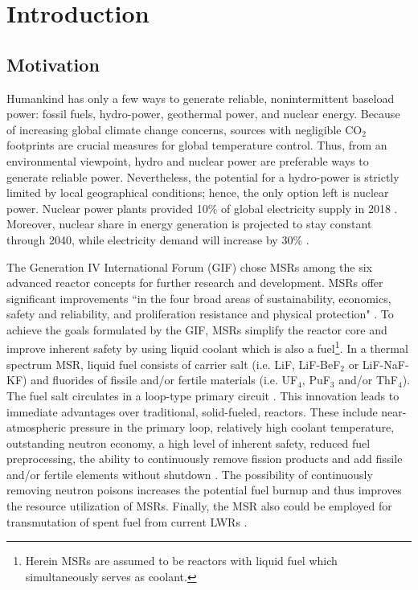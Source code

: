 \chapter[Introduction]{Introduction}
\section{Motivation}
Humankind has only a few ways to generate reliable, nonintermittent baseload 
power: fossil fuels, hydro-power, geothermal power, and nuclear energy. 
Because of increasing global climate change concerns, sources with negligible 
CO$_2$ footprints are crucial measures for global temperature control. Thus, 
from an environmental viewpoint, hydro and nuclear power are preferable ways 
to generate reliable power. Nevertheless, the potential for a hydro-power is 
strictly limited by local geographical conditions; hence, the only option left 
is nuclear power. Nuclear power plants provided 10\% of global electricity 
supply in 2018 \cite{iea_nuclear_2019}. Moreover, nuclear share in energy 
generation is projected to stay constant through 2040, while electricity 
demand will increase by 30\% \cite{noauthor_world_2017}. 

The Generation IV International Forum (GIF) chose \glspl{MSR} among the six 
advanced reactor concepts for further research and development. \glspl{MSR} 
offer significant improvements ``in the four broad areas of sustainability, 
economics, safety and reliability, and proliferation resistance and physical 
protection" \cite{doe_technology_2002}. To achieve the goals formulated by the 
GIF, \glspl{MSR} simplify the reactor core and improve inherent safety by 
using liquid coolant which is also a fuel\footnote{Herein \glspl{MSR} are 
assumed to be reactors with liquid fuel which simultaneously serves as 
coolant.}. In a thermal spectrum \gls{MSR}, liquid fuel consists of carrier 
salt (i.e. LiF, LiF-BeF$_2$ or LiF-NaF-KF) and fluorides of fissile and/or 
fertile materials (i.e. UF$_4$, PuF$_3$ and/or ThF$_4$). The fuel salt 
circulates in a loop-type primary circuit \cite{haubenreich_experience_1970}. 
This innovation leads to immediate advantages over traditional, solid-fueled, 
reactors. These include near-atmospheric pressure in the primary loop, 
relatively high coolant temperature, outstanding neutron economy, a high level 
of inherent safety, reduced fuel preprocessing, the ability to continuously 
remove fission products and add fissile and/or fertile elements without 
shutdown \cite{leblanc_molten_2010}. The possibility of continuously 
removing neutron poisons increases the potential fuel burnup and thus 
improves the resource utilization of \glspl{MSR}. Finally, the \gls{MSR} 
also could be employed for transmutation of spent fuel from current 
\glspl{LWR} \cite{fratoni_design_2004}.

